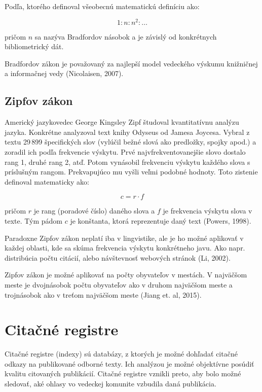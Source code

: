 Podľa, ktorého definoval všeobecnú matematickú definíciu ako:

\begin{equation}
\label{eq:bradfordov_zakon4}
1 : n : n^2 : \dotso
\end{equation}

pričom $n$ sa nazýva Bradfordov násobok a je závislý od konkrétnych
bibliometrický dát.

Bradfordov zákon je považovaný za najlepší model vedeckého výskumu knižničnej a
informačnej vedy (Nicolaisen, 2007).


\subsection{Zipfov zákon}

Americký jazykovedec George Kingsley Zipf študoval kvantitatívnu analýzu jazyka.
Konkrétne analyzoval text knihy Odyseus od Jamesa Joycesa.  Vybral z textu 29\,899 
špecifických slov (vylúčil bežné slová ako predložky, spojky apod.)  a
zoradil ich podľa frekvencie výskytu.  Prvé najvfrekventovanejšie slovo dostalo
rang 1, druhé rang 2, atď.  Potom vynásobil frekvenciu výskytu každého slova s
príslušným rangom.  Prekvapujúco mu vyšli veľmi podobné hodnoty.  Toto zistenie
definoval matematicky ako:

\begin{equation}
\label{eq:zipfov_zakon}
c = r \cdot f
\end{equation}

pričom $r$ je rang (poradové číslo) daného slova a $f$ je frekvencia výskytu
slova v texte.  Tým pádom $c$ je konštanta, ktorá reprezentuje daný text
(Powers, 1998).


Paradoxne Zipfov zákon neplatí iba v lingvistike, ale je ho možné aplikovať v
každej oblasti, kde sa skúma frekvencia výskytu konkrétneho javu.  Ako
napr.\,distribúcia počtu citácií, alebo návštevnosť webových stránok (Li, 2002).

Zipfov zákon je možné aplikovať na počty obyvateľov v mestách.  V najväčšom
meste je dvojnásobok počtu obyvateľov ako v druhom najväčšom meste a trojnásobok
ako v treťom najväčšom meste (Jiang et. al, 2015).


\section{Citačné registre}

Citačné registre  (indexy) sú databázy, z ktorých je možné dohľadať citačné
odkazy na publikované odborné texty.  Ich analýzou je možné objektívne posúdiť
kvalitu citovaných publikácií.  Citačné registre vznikli preto, aby bolo možné
sledovať, aké ohlasy vo vedeckej komunite vzbudila daná publikácia.

